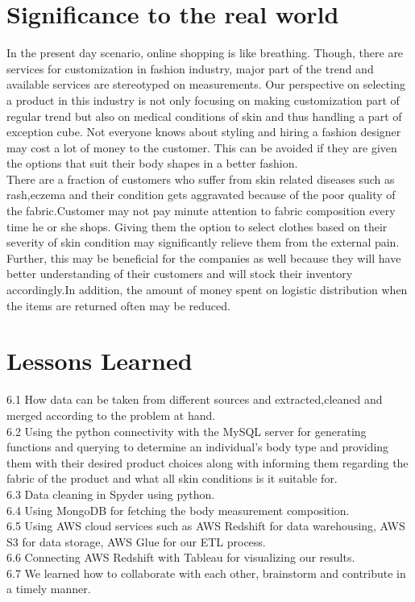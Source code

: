 \documentclass[11pt,journal,compsoc]{IEEEtran}
\begin{document}
\section{Significance to the real world}
In the present day scenario, online shopping is like breathing. Though, there are services for customization in fashion industry, major part of the trend and available services are stereotyped on measurements. Our perspective on selecting a product in this industry is not only focusing on making customization part of regular trend but also on medical conditions of skin and thus handling a part of exception cube. Not everyone knows about styling and hiring a fashion designer may cost a lot of money to the customer. This can be avoided if they are given the options that suit their body shapes in a better fashion. \\
There are a fraction of customers who suffer from skin related diseases such as rash,eczema and their condition gets aggravated because of the poor quality of the fabric.Customer may not pay minute attention to fabric composition every time he or she shops. Giving them the option to select clothes based on their severity of skin condition may significantly relieve them from the external pain. \\
Further, this may be beneficial for the companies as well because they will have better understanding of their customers and will stock their inventory accordingly.In addition, the amount of money spent on logistic distribution when the items are returned often may be reduced. \\


\section{Lessons Learned}
6.1 How data can be taken from different sources and extracted,cleaned and merged according to the problem at hand.\\
6.2 Using the python connectivity with the MySQL server for generating functions and querying to determine an individual's body type and providing them with their desired product choices along with informing them regarding the fabric of the product and what all skin conditions is it suitable for.\\
6.3 Data cleaning in Spyder using python.\\
6.4 Using MongoDB for fetching the body measurement composition.\\
6.5 Using AWS cloud services such as AWS Redshift for data warehousing, AWS S3 for data storage, AWS Glue for our ETL process.\\
6.6 Connecting AWS Redshift with Tableau for visualizing our results.\\
6.7 We learned how to collaborate with each other, brainstorm and contribute in a timely manner. \\
\end{document}

